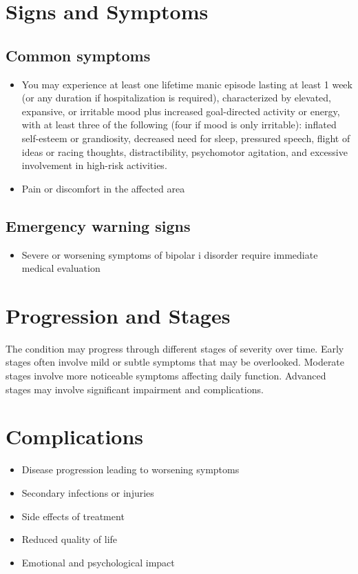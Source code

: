 \section{Signs and Symptoms}
\subsection{Common symptoms}
\begin{itemize}[noitemsep]
  \item You may experience at least one lifetime manic episode lasting at least 1 week (or any duration if hospitalization is required), characterized by elevated, expansive, or irritable mood plus increased goal-directed activity or energy, with at least three of the following (four if mood is only irritable): inflated self-esteem or grandiosity, decreased need for sleep, pressured speech, flight of ideas or racing thoughts, distractibility, psychomotor agitation, and excessive involvement in high-risk activities.
  \item Pain or discomfort in the affected area
  \end{itemize}
\subsection{Emergency warning signs}
\begin{itemize}[noitemsep]
  \item Severe or worsening symptoms of bipolar i disorder require immediate medical evaluation
\end{itemize}
\section{Progression and Stages}
The condition may progress through different stages of severity over time. Early stages often involve mild or subtle symptoms that may be overlooked. Moderate stages involve more noticeable symptoms affecting daily function. Advanced stages may involve significant impairment and complications.
\section{Complications}
\begin{itemize}[noitemsep]
  \item Disease progression leading to worsening symptoms
  \item Secondary infections or injuries
  \item Side effects of treatment
  \item Reduced quality of life
  \item Emotional and psychological impact
\end{itemize}
